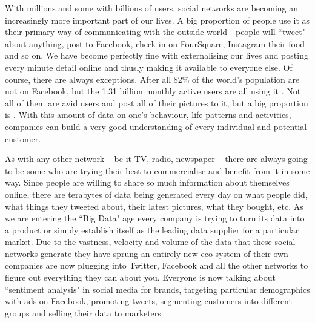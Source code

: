 \documentclass[minf,twoside,singlespacing,parskip,frontabs,notimes,11pt]{infthesis}
\begin{document}
With millions and some with billions of users, social networks are becoming an increasingly more important part of our lives. A big proportion of people use it as their primary way of communicating with the outside world - people will ``tweet" about anything, post to Facebook, check in on FourSquare, Instagram their food and so on. We have become perfectly fine with externalising our lives and posting every minute detail online and thusly making it available to everyone else. 
Of course, there are always exceptions. After all 82\% of the world's population are not on Facebook, but the 1.31 billion monthly active users are all using it \cite{FBStats}. Not all of them are avid users and post all of their pictures to it, but a big proportion is \cite{FBStats}. With this amount of data on one's behaviour, life patterns and activities, companies can build a very good understanding of every individual and potential customer.


As with any other network -- be it TV, radio, newspaper -- there are always going to be some who are trying their best to commercialise and benefit from it in some way. Since people are willing to share so much information about themselves online, there are terabytes of data being generated every day on what people did, what things they tweeted about, their latest pictures, what they bought, etc. As we are entering the ``Big Data" age every company is trying to turn its data into a product or simply establish itself as the leading data supplier for a particular market. Due to the vastness, velocity and volume of the data that these social networks generate they have sprung an entirely new eco-system of their own -- companies are now plugging into Twitter, Facebook and all the other networks to figure out everything they can about you. Everyone is now talking about ``sentiment analysis" in social media for brands, targeting particular demographics with ads on Facebook, promoting tweets, segmenting customers into different groups and selling their data to marketers.
\end{document}
